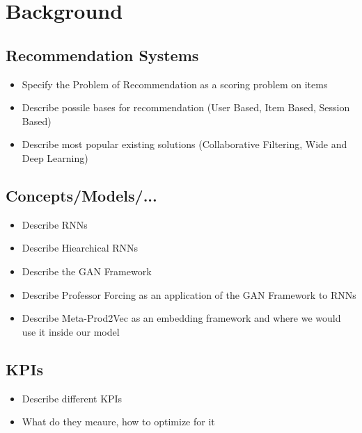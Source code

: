 \chapter{Background}

\section{Recommendation Systems}
\begin{itemize}
\item Specify the Problem of Recommendation as a scoring problem on items
\item Describe possile bases for recommendation (User Based, Item Based, Session Based)
\item Describe most popular existing solutions (Collaborative Filtering, Wide and Deep Learning)
\end{itemize}

\section{Concepts/Models/...}
\begin{itemize}
\item Describe RNNs
\item Describe Hiearchical RNNs
\item Describe the GAN Framework
\item Describe Professor Forcing as an application of the GAN Framework to RNNs
\item Describe Meta-Prod2Vec as an embedding framework and where we would use it inside our model
\end{itemize}

\section{KPIs}
\begin{itemize}
\item Describe different KPIs
\item What do they meaure, how to optimize for it
\end{itemize}